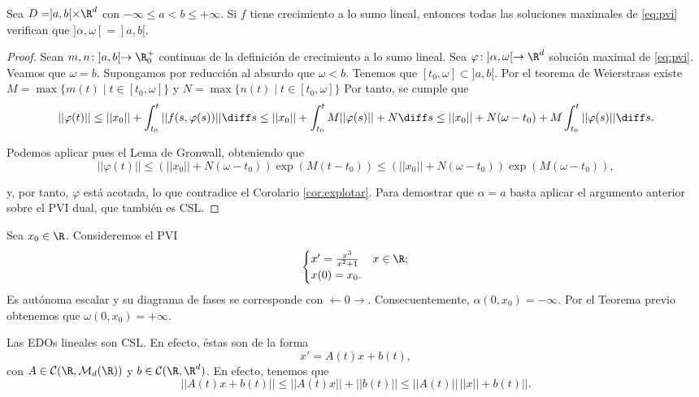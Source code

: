 \documentclass{article}
\begin{document}
\begin{theorem}
  Sea $D = ]a,b[\times\R^d$ con $-\infty \le a < b \le +\infty$. Si $f$ tiene crecimiento a lo sumo
  lineal, entonces todas las soluciones maximales de \eqref{eq:pvi} verifican que
  $]\alpha, \omega[ = ]a,b[$.
\end{theorem}
\begin{proof}
  Sean $m, n \colon ]a,b[ \to \R_0^+$ continuas de la definición de crecimiento a lo sumo
  lineal. Sea $\varphi \colon ]\alpha, \omega[ \to \R^d$ solución maximal de \eqref{eq:pvi}. Veamos
  que $\omega = b$. Supongamos por reducción al absurdo que $\omega < b$. Tenemos que
  $[t_0, \omega] \subset ]a,b[$. Por el teorema de Weierstrass existe
  $M = \max \{m(t) \mid t \in [t_0,\omega]\}$ y $N = \max \{n(t) \mid t \in [t_0,\omega]\}$ Por
  tanto, se cumple que
  \[ ||\varphi(t)|| \le ||x_0|| + \int_{t_0}^{t} ||f(s, \varphi(s))|| \diff s \le ||x_0|| +
    \int_{t_0}^{t} M||\varphi(s)|| + N \diff s \le ||x_0|| + N(\omega - t_0) + M \int_{t_0}^{t}
    ||\varphi(s)|| \diff s. \]

  Podemos aplicar pues el Lema de Gronwall, obteniendo que
  \[||\varphi(t)|| \le (||x_0|| + N (\omega-t_0)) \exp(M(t - t_0)) \le (||x_0|| + N (\omega-t_0))
    \exp(M(\omega - t_0)),\]

  y, por tanto, $\varphi$ está acotada, lo que contradice el Corolario \ref{cor:explotar}. Para
  demostrar que $\alpha = a$ basta aplicar el argumento anterior sobre el PVI dual, que también es
  CSL.
\end{proof}

\begin{ex}
  Sea $x_0 \in \R$. Consideremos el PVI
  \[
    \begin{cases}
      x' = \frac{x^3}{x^2+1} & x \in \R; \\
      x(0) = x_0.
    \end{cases}
  \]
  Es autónoma escalar y su diagrama de fases se corresponde con $\leftarrow 0
  \rightarrow$. Consecuentemente, $\alpha(0,x_0) = -\infty$. Por el Teorema previo obtenemos que
  $\omega(0,x_0) = +\infty$.
\end{ex}

\begin{remark}
  Las EDOs lineales son CSL. En efecto, éstas son de la forma
  \[ x' = A(t) x + b(t), \] con $A \in \mathcal{C}(\R, \mathcal{M}_{d}(\R))$ y
  $b \in \mathcal{C}(\R, \R^d)$. En efecto, tenemos que
  \[ ||A(t)x +b(t)|| \le ||A(t)x||+||b(t)|| \le ||A(t)|| \,||x|| + b(t)||. \]
\end{remark}
\end{document}

